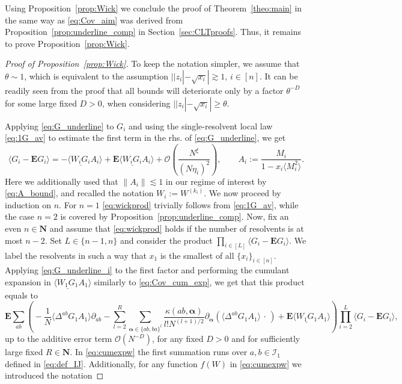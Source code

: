 \documentclass[10pt]{amsart}
\numberwithin{equation}{section}
\newcommand{\E}{\mathbf{E}}
\newcommand{\N}{\mathbf{N}}
\begin{document}
Using Proposition~\ref{prop:Wick} we conclude the proof of Theorem~\ref{theo:main} in the same way as \eqref{eq:Cov_aim} was derived from Proposition~\ref{prop:underline_comp} in Section~\ref{sec:CLTproofs}. Thus, it remains to prove Proposition~\ref{prop:Wick}.

\begin{proof}[Proof of Proposition~\ref{prop:Wick}]
To keep the notation simpler, we assume that $\theta\sim 1$, which is equivalent to the assumption $||z_i|-\sqrt{x_i}|\gtrsim 1$, $i\in[n]$. It can be readily seen from the proof that all bounds will deteriorate only by a factor $\theta^{-D}$ for some large fixed $D>0$, when considering $||z_i|-\sqrt{x_i}|\ge \theta$.

Applying \eqref{eq:G_underline} to $G_i$ and using the single-resolvent local law \eqref{eq:1G_av} to estimate the first term in the rhs. of \eqref{eq:G_underline}, we get
\begin{equation}
\langle G_i-\E G_i\rangle=-\langle\underline{W_iG_i}A_i\rangle+\E\langle\underline{W_iG_i}A_i\rangle+\mathcal{O}\left(\frac{N^\xi}{(N\eta_i)^2}\right),\qquad A_i:=\frac{M_i}{1-x_i\langle M_i^2\rangle}.
\label{eq:G_underline_i}
\end{equation}
Here we additionally used that $\|A_i\|\lesssim 1$ in our regime of interest by \eqref{eq:A_bound}, and recalled the notation $W_i:=W^{(k_i)}$. We now proceed by induction on $n$. For $n=1$ \eqref{eq:wickprod} trivially follows from \eqref{eq:1G_av}, while the case $n=2$ is covered by Proposition~\ref{prop:underline_comp}. Now, fix an even $n\in\mathbf{N}$ and assume that \eqref{eq:wickprod} holds if the number of resolvents is at most $n-2$. Set $L\in \{n-1, n\}$ and consider the product $\prod_{i\in [L]} \langle G_i-\E G_i\rangle$. We label the resolvents in such a way that $x_1$ is the smallest of all $\{x_i\}_{i\in[n]}$. Applying \eqref{eq:G_underline_i} to the first factor and performing the cumulant expansion in $\langle\underline{W_1G_1}A_1\rangle$ similarly to \eqref{eq:Cov_cum_exp}, we get that this product equals to
\begin{equation}
\label{eq:cumexpw}
\E\sum_{ab}\!\left(\!\! -\frac{1}{N}\langle \Delta^{ab}G_1A_1\rangle\partial_{ab}\!-\!\sum_{l=2}^R\sum_{{\bm \alpha}\in\{ab,ba\}^l}\!\frac{\kappa(ab,{\bm \alpha})}{l! N^{(l+1)/2}}\partial_{{\bm\alpha}}(\langle \Delta^{ab}G_1A_1\rangle\,\cdot\,)+\E\langle\underline{W_1G_1}A_1\rangle\right)\!\!\prod_{i=2}^L\langle G_i-\E G_i\rangle,
\end{equation}
up to the additive error term $\mathcal{O}(N^{-D})$, for any fixed $D>0$ and for sufficiently large fixed $R\in\N$. In \eqref{eq:cumexpw} the first summation runs over $a,b\in\mathcal{I}_1$ defined in \eqref{eq:def_IJ}. Additionally, for any function $f(W)$ in \eqref{eq:cumexpw} we introduced the notation

\end{proof}
\end{document}
